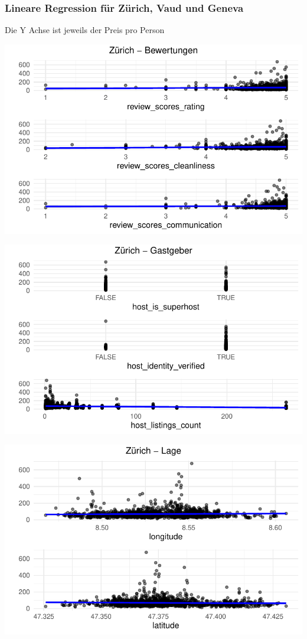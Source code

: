 \documentclass[
  journal,
]{IEEEtran}%
\begin{document}
\hypertarget{lineare-regression-fuxfcr-zuxfcrich-vaud-und-geneva}{%
\subsubsection{Lineare Regression für Zürich, Vaud und
Geneva}\label{lineare-regression-fuxfcr-zuxfcrich-vaud-und-geneva}}

Die Y Achse ist jeweils der Preis pro Person

\includegraphics{main_files/figure-pdf/unnamed-chunk-12-1.pdf}

\includegraphics{main_files/figure-pdf/unnamed-chunk-12-2.pdf}

\includegraphics{main_files/figure-pdf/unnamed-chunk-12-3.pdf}
\end{document}
